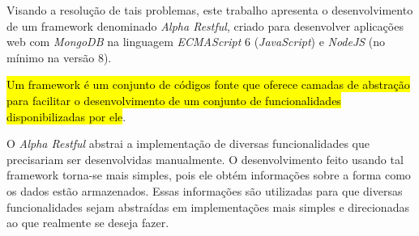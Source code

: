 Visando a resolução de tais problemas, este trabalho apresenta o desenvolvimento de um framework denominado \textit{Alpha Restful}, criado para desenvolver aplicações web com \textit{MongoDB} na linguagem \textit{ECMAScript} 6 (\textit{JavaScript}) e \textit{NodeJS} (no mínimo na versão 8).

\hl{Um framework é um conjunto de códigos fonte que oferece camadas de abstração para facilitar o desenvolvimento de um conjunto de funcionalidades disponibilizadas por ele}.


O \textit{Alpha Restful} abstrai a implementação de diversas funcionalidades que precisariam ser desenvolvidas manualmente. O desenvolvimento feito usando tal framework torna-se mais simples, pois ele obtém informações sobre a forma como os dados estão armazenados. Essas informações são utilizadas para que diversas funcionalidades sejam abstraídas em implementações mais simples e direcionadas ao que realmente se deseja fazer. 





